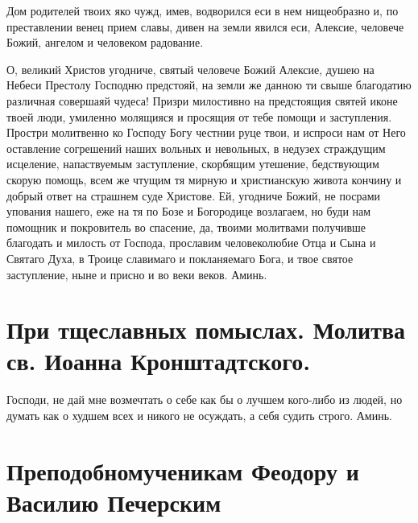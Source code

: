 

Дом родителей твоих яко чужд, имев, водворился еси в нем нищеобразно и, по преставлении венец прием славы, дивен на земли явился еси, Алексие, человече Божий, ангелом и человеком радование.




О, великий Христов угодниче, святый человече Божий Алексие, душею на Небеси Престолу Господню предстояй, на земли же данною ти свыше благодатию различная совершаяй чудеса! Призри милостивно на предстоящия святей иконе твоей люди, умиленно молящияся и просящия от тебе помощи и заступления. Простри молитвенно ко Господу Богу честнии руце твои, и испроси нам от Него оставление согрешений наших вольных и невольных, в недузех страждущим исцеление, напаствуемым заступление, скорбящим утешение, бедствующим скорую помощь, всем же чтущим тя мирную и христианскую живота кончину и добрый ответ на страшнем суде Христове. Ей, угодниче Божий, не посрами упования нашего, еже на тя по Бозе и Богородице возлагаем, но буди нам помощник и покровитель во спасение, да, твоими молитвами получивше благодать и милость от Господа, прославим человеколюбие Отца и Сына и Святаго Духа, в Троице славимаго и покланяемаго Бога, и твое святое заступление, ныне и присно и во веки веков. Аминь.


\section{При тщеславных помыслах. Молитва св. Иоанна Кронштадтского.}
 


Господи, не дай мне возмечтать о себе как бы о лучшем кого-либо из людей, но думать как о худшем всех и никого не осуждать, а себя судить строго. Аминь.
\longpage{}\mychapterending


 

\section{Преподобномученикам Феодору и Василию Печерским}
 




